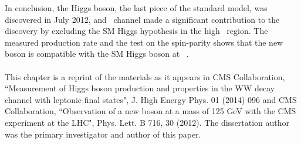 In conclusion, the Higgs boson, the last piece of the standard model, 
was discovered in July 2012, and \hww\ channel made a significant contribution 
to the discovery by excluding the SM Higgs hypothesis in the high \mHi\ region. 
The measured production rate and the test on the spin-parity shows 
that the new boson is compatible with the SM Higgs boson at ~\GeV.  
\\
\\

This chapter is a reprint of the materials as it appears in
CMS Collaboration, 
 ``Measurement of Higgs boson production and properties in the WW decay channel with 
 leptonic final states", J. High Energy Phys. 01 (2014) 096 and 
CMS Collaboration, 
 ``Observation of a new boson at a mass of 125 GeV with the CMS experiment at the LHC", 
 Phys. Lett. B 716, 30 (2012).
The dissertation author was the primary investigator and author of this paper. 

